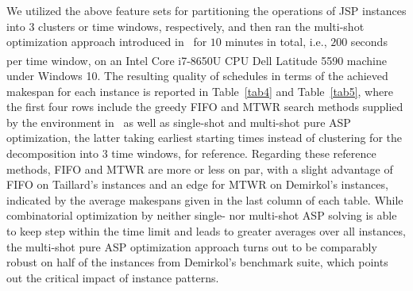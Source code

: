 \documentclass[runningheads]{llncs}
\begin{document}
We utilized the above feature sets for partitioning the operations of JSP instances into $3$ clusters or time windows, respectively,
and then ran the multi-shot optimization approach introduced in~\cite{el2020job} for
$10$ minutes in total, i.e., $200$ seconds per time window,
on an
Intel\textsuperscript{\textregistered} Core\texttrademark{} i7-8650U CPU %
Dell Latitude 5590 machine under Windows 10.
%
The resulting quality of schedules in terms of the achieved makespan for each instance is reported in Table~\ref{tab4} and Table~\ref{tab5},
where the first four rows include the greedy FIFO and MTWR search methods supplied by the environment in~\cite{tagesc21a}
as well as single-shot and multi-shot pure ASP optimization, the latter taking earliest starting times instead of 
clustering for the decomposition into $3$ time windows,
for reference.
%
Regarding these reference methods, FIFO and MTWR are more or less on par, with a slight advantage of FIFO on Taillard's instances and an edge for MTWR on Demirkol's instances, 
indicated
by the average makespans given in the last column of each table.
While combinatorial optimization by neither single- nor multi-shot ASP 
solving is able to keep step within the time limit and leads to greater averages over all instances, the multi-shot pure ASP optimization approach turns out to be comparably robust
on half of the instances from Demirkol's benchmark suite,
which points out the critical impact of instance patterns.
%
\end{document}
